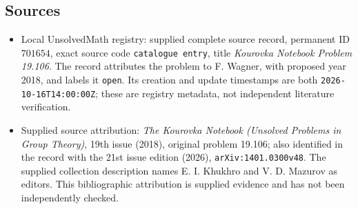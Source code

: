 \documentclass[11pt]{article}
\begin{document}
\subsection{Sources}
\begin{itemize}
\item Local UnsolvedMath registry: supplied complete source record, permanent ID \(701654\), exact source code \texttt{catalogue entry}, title \emph{Kourovka Notebook Problem 19.106}. The record attributes the problem to F. Wagner, with proposed year 2018, and labels it \texttt{open}. Its creation and update timestamps are both \texttt{2026-10-16T14:00:00Z}; these are registry metadata, not independent literature verification.
\item Supplied source attribution: \emph{The Kourovka Notebook (Unsolved Problems in Group Theory)}, 19th issue (2018), original problem 19.106; also identified in the record with the 21st issue edition (2026), \texttt{arXiv:1401.0300v48}. The supplied collection description names E. I. Khukhro and V. D. Mazurov as editors. This bibliographic attribution is supplied evidence and has not been independently checked.
\end{itemize}
\end{document}
